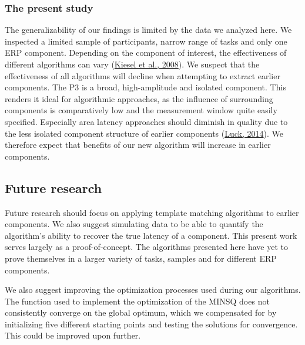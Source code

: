 \documentclass[
  man,floatsintext]{apa7}
\begin{document}
\hypertarget{the-present-study-1}{%
\subsubsection{The present study}\label{the-present-study-1}}

The generalizability of our findings is limited by the data we analyzed here. We inspected a limited sample of participants, narrow range of tasks and only one ERP component. Depending on the component of interest, the effectiveness of different algorithms can vary (\protect\hyperlink{ref-kiesel2008measurement}{Kiesel et al., 2008}). We suspect that the effectiveness of all algorithms will decline when attempting to extract earlier components. The P3 is a broad, high-amplitude and isolated component. This renders it ideal for algorithmic approaches, as the influence of surrounding components is comparatively low and the measurement window quite easily specified. Especially area latency approaches should diminish in quality due to the less isolated component structure of earlier components (\protect\hyperlink{ref-luck2014introduction}{Luck, 2014}). We therefore expect that benefits of our new algorithm will increase in earlier components.

\hypertarget{future-research}{%
\subsection{Future research}\label{future-research}}

Future research should focus on applying template matching algorithms to earlier components. We also suggest simulating data to be able to quantify the algorithm's ability to recover the true latency of a component. This present work serves largely as a proof-of-concept. The algorithms presented here have yet to prove themselves in a larger variety of tasks, samples and for different ERP components.

We also suggest improving the optimization processes used during our algorithms. The function used to implement the optimization of the MINSQ does not consistently converge on the global optimum, which we compensated for by initializing five different starting points and testing the solutions for convergence. This could be improved upon further.
\end{document}
